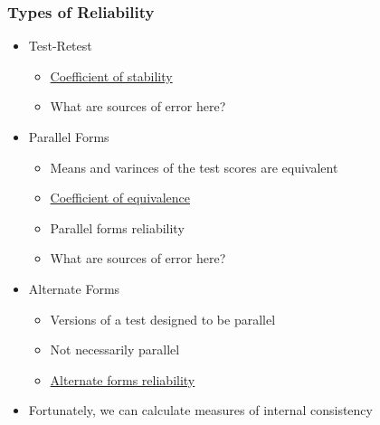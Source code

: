 \documentclass[dvipsnames]{beamer}\usepackage[]{graphicx}\usepackage[]{color}
\begin{document}
\begin{frame}
\frametitle{Types of Reliability}
\begin{itemize}
\item <1->Test-Retest
  \begin{itemize}
    \item<1-> \underline{Coefficient of stability}
    \item <1->What are sources of error here?
  \end{itemize}
\item <2->Parallel Forms
  \begin{itemize}
    \item <2->Means and varinces of the test scores are equivalent
    \item <2->\underline{Coefficient of equivalence}
    \item <2->Parallel forms reliability
    \item <2->What are sources of error here?
  \end{itemize}
\item<3-> Alternate Forms 
  \begin{itemize}
    \item<3-> Versions of a test designed to be parallel
    \item<3-> Not necessarily parallel
    \item<3-> \underline{Alternate forms reliability}
  \end{itemize}
\item<4-> Fortunately, we can calculate measures of internal consistency
\end{itemize}
\end{frame}
\end{document}
